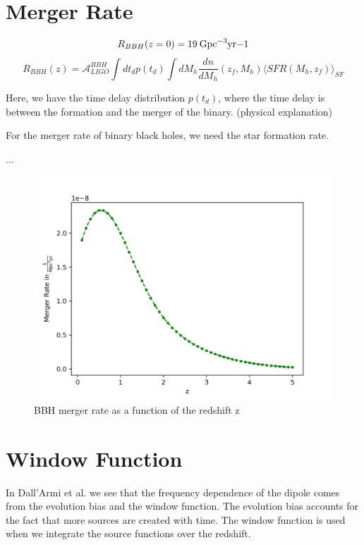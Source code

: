 \section{Merger Rate}
\begin{equation}
    R_{BBH}(z=0) = 19 \:\rm{Gpc}^{-3}\rm{yr}{-1}
\end{equation}
\begin{equation}
    R_{BBH}(z)=\mathcal{A}_{LIGO}^{BBH}\int dt_d p(t_d) \int dM_h \frac{dn}{dM_h}(z_f, M_h)\langle SFR(M_h, z_f)\rangle_{SF}
    \label{BBH_merger_equation}
\end{equation}

Here, we have the time delay distribution $p(t_d)$, where the time delay is between the formation and the merger of the binary. (physical explanation)

For the merger rate of binary black holes, we need the star formation rate. 

...

\begin{figure}[h]
    \centering
    \includegraphics[width=1\linewidth]{Images/bbh_merger_rate.png}
    \caption{BBH merger rate as a function of the redshift z}
    \label{bbh_merger_rate}
   \end{figure} 


\section{Window Function}
\label{window_fct_section}

In Dall'Armi et al. \cite{dallarmi_dipole_2022} we see that the frequency dependence 
of the dipole comes from the evolution bias and the window function. The evolution 
bias accounts for the fact that more sources are created with time. The window 
function is used when we integrate the source functions over the redshift. 

